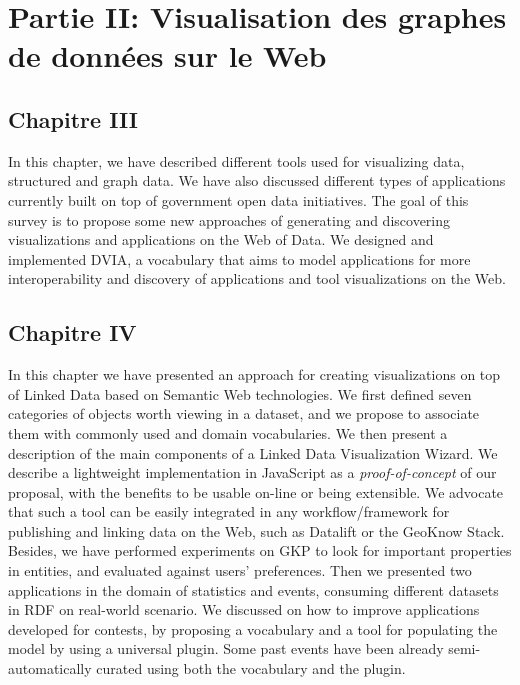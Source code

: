 \documentclass[a4paper,11pt,twoside]{report}
\begin{document}
\chapter*{Partie II: Visualisation des graphes de données sur le Web}

\section*{Chapitre III}

In this chapter, we have described different tools used for visualizing data, structured and graph data. We have also discussed different types of applications currently built on top of government open data initiatives. The goal of this survey is to propose some new approaches of generating and discovering visualizations and applications on the Web of Data. We designed and implemented DVIA, a vocabulary that aims to model applications for more interoperability and discovery of applications and tool visualizations on the Web.

\section*{Chapitre IV}

In this chapter we have presented  an approach for creating visualizations on top of Linked Data based on Semantic Web technologies. We first defined seven categories of objects worth viewing in a dataset, and we propose to associate them with commonly used and domain vocabularies. We then present a description of the main components of a Linked Data Visualization Wizard. We describe a lightweight implementation in JavaScript as a \textit{proof-of-concept} of our proposal, with the benefits to be usable on-line or being extensible. We advocate that such a tool can be easily integrated  in any workflow/framework for publishing and linking data on the Web, such as Datalift or the GeoKnow Stack. Besides, we have performed experiments on GKP to look for important properties in entities, and evaluated against users' preferences. Then we presented two applications in the domain of statistics and events, consuming different datasets in RDF on real-world scenario. We discussed on how to improve applications developed for contests, by proposing a vocabulary and a tool for populating the model by using a universal plugin. Some past events have been already semi-automatically curated using both the vocabulary and the plugin.
\end{document}
